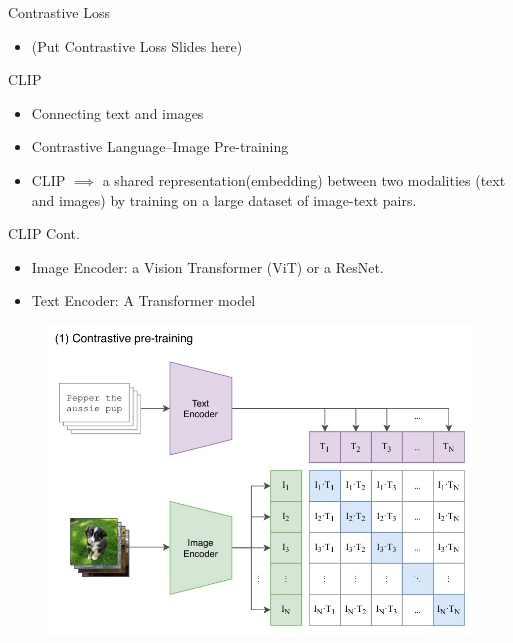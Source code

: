 \documentclass[serif, aspectratio=169]{beamer}
\begin{document}
\begin{frame}{Contrastive Loss}
\begin{itemize}
\item (Put Contrastive Loss Slides here)
\end{itemize}
\end{frame}

\begin{frame}{CLIP}
\begin{itemize}
\item Connecting text and images
\item Contrastive Language–Image Pre-training
\item CLIP $\implies$ a shared representation(embedding) between two modalities (text and images) by training on a large dataset of image-text pairs.
\end{itemize}
\end{frame}

\begin{frame}{CLIP Cont.}
\begin{itemize}
\item Image Encoder: a Vision Transformer (ViT) or a ResNet.
\item Text Encoder: A Transformer model 
\end{itemize}
\begin{figure}[hb]
        \begin{center}
            \includegraphics[keepaspectratio, scale=0.5]{pic/clip-overview.jpg}
        \end{center}
    \end{figure}
\end{frame}
\end{document}
